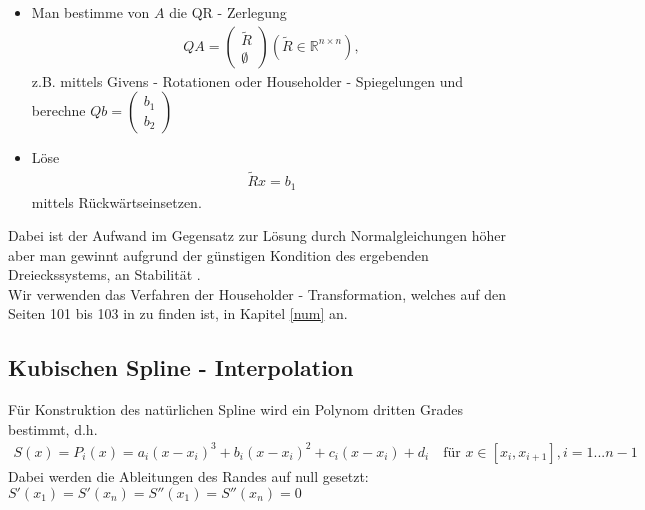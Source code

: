 \begin{itemize}
\item Man bestimme von $A$ die QR - Zerlegung 
\begin{align}
	QA = \left(\begin{array}{c}
	\tilde{R} \\ 
	\emptyset
	\end{array} 
	\right) (\tilde{R} \in \mathbb{R}^{n \times n}),
\end{align}
z.B. mittels Givens - Rotationen oder Householder - Spiegelungen und berechne \small{$Qb= \left(\begin{array}{c}
b_1 \\ 
b_2
\end{array} \right)$} \normalsize
\item
	Löse \begin{align}
		\tilde{R} x = b_1
	\end{align}
	mittels Rückwärtseinsetzen.
\end{itemize}
Dabei ist der Aufwand im Gegensatz zur Lösung durch Normalgleichungen höher aber man gewinnt aufgrund der günstigen Kondition des ergebenden Dreieckssystems, an Stabilität \cite[Seite 129 - 130]{Dahmen2008}.\\
Wir verwenden das Verfahren der Householder - Transformation, welches auf den Seiten 101 bis 103 in \cite{Dahmen2008} zu finden ist, in Kapitel \ref{num} an.
\subsection{Kubischen Spline - Interpolation}\label{a:spline}
Für Konstruktion des natürlichen Spline wird ein Polynom dritten Grades bestimmt, d.h.
\begin{align}
S(x) = P_i(x) = a_i(x-x_i)^3 + b_i(x-x_i)^2 + c_i(x-x_i) +d_i \quad \text{für } x\in [x_i, x_{i+1}], i=1...n-1
\end{align}
Dabei werden die Ableitungen des Randes auf null gesetzt: $S'(x_1) = S'(x_n) = S''(x_1) = S''(x_n) = 0$ \label{spline:bed}
